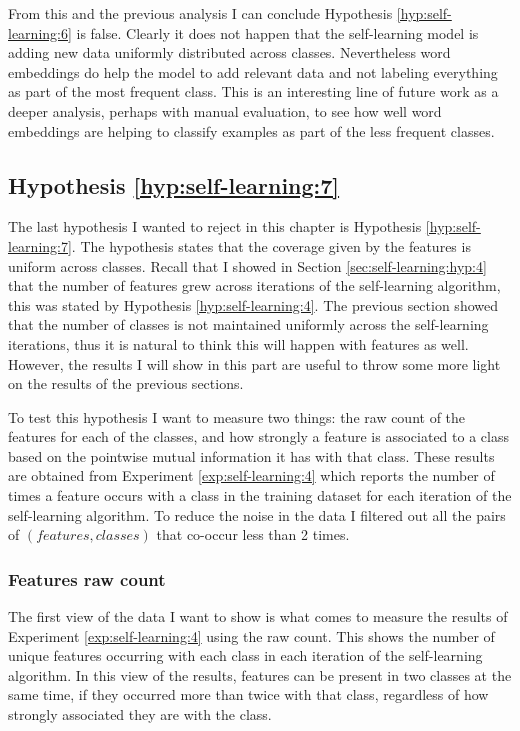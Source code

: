 From this and the previous analysis I can conclude Hypothesis
\ref{hyp:self-learning:6} is false. Clearly it does not happen that the
self-learning model is adding new data uniformly distributed across classes.
Nevertheless word embeddings do help the model to add relevant data and not
labeling everything as part of the most frequent class. This is an interesting
line of future work as a deeper analysis, perhaps with manual evaluation, to
see how well word embeddings are helping to classify examples as part of the
less frequent classes.

\subsection{Hypothesis \ref{hyp:self-learning:7}}\label{sec:self-learning:hyp:7}

The last hypothesis I wanted to reject in this chapter is Hypothesis
\ref{hyp:self-learning:7}. The hypothesis states that the coverage given by the
features is uniform across classes. Recall that I showed in Section
\ref{sec:self-learning:hyp:4} that the number of features grew across
iterations of the self-learning algorithm, this was stated by Hypothesis
\ref{hyp:self-learning:4}. The previous section showed that the number of
classes is not maintained uniformly across the self-learning iterations, thus
it is natural to think this will happen with features as well. However, the
results I will show in this part are useful to throw some more light on the
results of the previous sections.

To test this hypothesis I want to measure two things: the raw count of the
features for each of the classes, and how strongly a feature is associated to a
class based on the pointwise mutual information it has with that class. These
results are obtained from Experiment \ref{exp:self-learning:4} which reports
the number of times a feature occurs with a class in the training dataset for
each iteration of the self-learning algorithm. To reduce the noise in the data
I filtered out all the pairs of $(features, classes)$ that co-occur less than 2
times.

\subsubsection{Features raw count}

The first view of the data I want to show is what comes to measure the results
of Experiment \ref{exp:self-learning:4} using the raw count. This shows the
number of unique features occurring with each class in each iteration of the
self-learning algorithm. In this view of the results, features can be present
in two classes at the same time, if they occurred more than twice with that
class, regardless of how strongly associated they are with the class.

